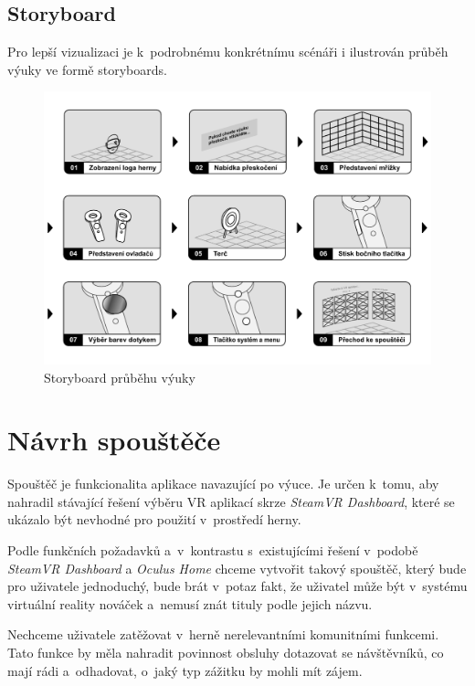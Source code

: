 \subsection{Storyboard}\label{storyboards}

Pro lepší vizualizaci je k~podrobnému konkrétnímu scénáři i ilustrován
průběh výuky ve formě storyboards.

\begin{figure}[h!]
\centering
\includegraphics[width=\textwidth]{src/assets/storyboard.pdf}
\caption{Storyboard průběhu výuky}
\end{figure}

\section{Návrh spouštěče}\label{nuxe1vrh-spouux161tux11bux10de}

Spouštěč je funkcionalita aplikace navazující po výuce. Je určen k~tomu,
aby nahradil stávající řešení výběru VR aplikací skrze \emph{SteamVR
Dashboard}, které se ukázalo být nevhodné pro použití v~prostředí herny.

Podle funkčních požadavků a~v~kontrastu s~existujícími řešení v~podobě
\emph{SteamVR Dashboard} a \emph{Oculus Home} chceme vytvořit takový
spouštěč, který bude pro uživatele jednoduchý, bude brát v~potaz fakt,
že uživatel může být v~systému virtuální reality nováček a~nemusí
znát tituly podle jejich názvu. 

Nechceme uživatele zatěžovat v~herně
nerelevantními komunitními funkcemi. Tato funkce by měla nahradit
povinnost obsluhy dotazovat se návštěvníků, co mají rádi a~odhadovat,
o~jaký typ zážitku by mohli mít zájem.

